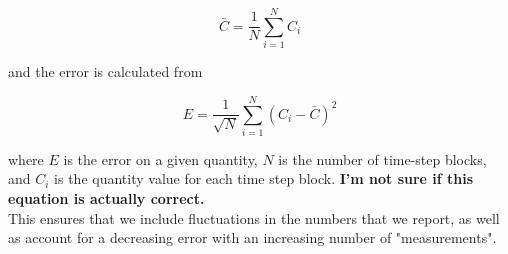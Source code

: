 \documentclass{article}
\begin{document}
\begin{multicols}{2}
\begin{equation}
\bar{C} = \frac{1}{N}\sum \limits _{i=1}^N C_i 
\end{equation}

\noindent and the error is calculated from 

\begin{equation}
E = \frac{1}{\sqrt{N}}\sum \limits _{i=1}^N (C_i - \bar{C})^2
\end{equation}

\noindent where $E$ is the error on a given quantity, $N$ is the number of time-step blocks, and $C_i$ is the quantity value for each time step block.  \textbf{I'm not sure if this equation is actually correct.}\\

This ensures that we include fluctuations in the numbers that we report, as well as account for a decreasing error with an increasing number of "measurements".  


\end{multicols}




  
\end{document}
